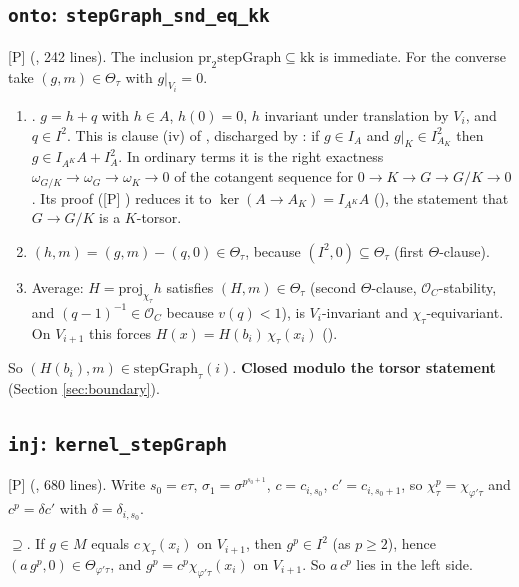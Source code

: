 \documentclass[11pt]{article}
\newcommand{\mP}{\textsf{[P]}}
\newcommand{\cO}{\mathcal O}
\theoremstyle{remark}
\begin{document}
\subsection{\texttt{onto}: \texttt{stepGraph\_snd\_eq\_kk}}
\mP{}  (, 242 lines). The inclusion $\mathrm{pr}_2\mathrm{stepGraph}\subseteq\mathrm{kk}$ is immediate. For the converse take $(g,m)\in\Theta_\tau$ with $g|_{V_i}=0$.
\begin{enumerate}[nosep]
\item {}. $g=h+q$ with $h\in A$, $h(0)=0$, $h$ invariant under translation by $V_i$, and $q\in I^2$. This is clause (iv) of , discharged by : if $g\in I_A$ and $g|_K\in I_{A_K}^2$ then $g\in I_{A^K}A+I_A^2$. In ordinary terms it is the right exactness $\omega_{G/K}\to\omega_G\to\omega_K\to0$ of the cotangent sequence for $0\to K\to G\to G/K\to0$. Its proof (\mP{} ) reduces it to $\ker(A\to A_K)=I_{A^K}A$ (), the statement that $G\to G/K$ is a $K$-torsor.
\item $(h,m)=(g,m)-(q,0)\in\Theta_\tau$, because $(I^2,0)\subseteq\Theta_\tau$ (first $\Theta$-clause).
\item Average: $H=\mathrm{proj}_{\chi_\tau}h$ satisfies $(H,m)\in\Theta_\tau$ (second $\Theta$-clause, $\cO_C$-stability, and $(q-1)^{-1}\in\cO_C$ because $v(q)<1$), is $V_i$-invariant and $\chi_\tau$-equivariant. On $V_{i+1}$ this forces $H(x)=H(b_i)\,\chi_\tau(x_i)$ ().
\end{enumerate}
So $(H(b_i),m)\in\mathrm{stepGraph}_\tau(i)$. \textbf{Closed modulo the torsor statement } (Section \ref{sec:boundary}).

\subsection{\texttt{inj}: \texttt{kernel\_stepGraph}}
\mP{}  (, 680 lines). Write $s_0=e\tau$, $\sigma_1=\sigma^{p^{s_0+1}}$, $c=c_{i,s_0}$, $c'=c_{i,s_0+1}$, so $\chi_\tau^p=\chi_{\varphi'\tau}$ and $c^p=\delta c'$ with $\delta=\delta_{i,s_0}$.

$\supseteq$. If $g\in M$ equals $c\,\chi_\tau(x_i)$ on $V_{i+1}$, then $g^p\in I^2$ (as $p\ge2$), hence $(a\,g^p,0)\in\Theta_{\varphi'\tau}$, and $g^p=c^p\chi_{\varphi'\tau}(x_i)$ on $V_{i+1}$. So $a\,c^p$ lies in the left side.
\end{document}
